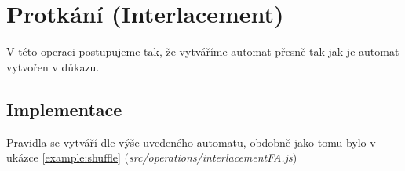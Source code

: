 \section{Protkání (Interlacement)}
V této operaci postupujeme tak, že vytváříme automat přesně tak jak je automat vytvořen v důkazu.
\subsection{Implementace}
Pravidla se vytváří dle výše uvedeného automatu, obdobně jako tomu bylo v ukázce \ref{example:shuffle}
(\textit{src/operations/interlacementFA.js})